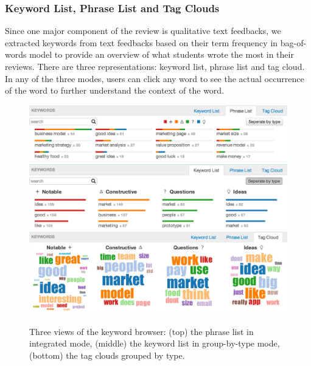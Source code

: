 \documentclass{sigchi}
\begin{document}
\subsubsection{Keyword List, Phrase List and Tag Clouds}

Since one major component of the review is qualitative text feedbacks,
we extracted keywords from text feedbacks based on their term frequency in bag-of-
words model \cite{bag-of-words} to provide an overview of what students
wrote the most in their reviews.
There are three representations: keyword list, phrase list and tag cloud.
In any of the three modes, users can click any word to see the actual occurrence of the word to further understand the context of the word.


\begin{figure}[b]
\centering
\includegraphics[width=2.0\columnwidth]{images/phrase-list}
\includegraphics[width=2.0\columnwidth]{images/keyword-list}
\includegraphics[width=2.0\columnwidth]{images/clouds}
\caption{Three views of the keyword browser:
(top) the phrase list in integrated mode,
(middle) the keyword list in group-by-type mode,
(bottom) the tag clouds grouped by type.}
\label{fig:keyword-lists}
\end{figure}
\end{document}
